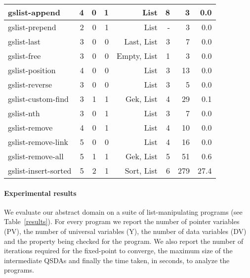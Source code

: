 \documentclass{llncs}
\begin{document}
\begin{table*}[thb]
{\begin{tabular}{|l| r | r | r | r|| r | r |r||}
{\sc gslist-append} & 4 & 0 & 1 & {\sc List} & 8 & 3 & 0.0 \\ \hline
{\sc gslist-prepend} & 2 & 0 & 1 & {\sc List} & - & 3 & 0.0  \\ \hline
{\sc gslist-last} & 3 & 0 & 0 & {\sc Last, List} & 3 & 7 & 0.0 \\ \hline
{\sc gslist-free} & 3 & 0 & 0 & {\sc Empty, List} & 1 & 3 & 0.0 \\ \hline
{\sc gslist-position} &4 & 0 & 0 & {\sc List} & 3 & 13 &  0.0 \\ \hline
{\sc gslist-reverse} & 3 & 0 & 0 & {\sc List} & 3 & 5 & 0.0 \\ \hline
{\sc gslist-custom-find} &3 & 1 & 1 & {\sc Gek, List}  & 4 & 29 & 0.1 \\ \hline
{\sc gslist-nth} & 3 & 0 & 1 & {\sc List} & 3 & 7 & 0.0 \\ \hline
{\sc gslist-remove} & 4 & 0 & 1 & {\sc List} & 4 & 10 & 0.0 \\ \hline
{\sc gslist-remove-link} & 5 & 0 & 0 & {\sc List} & 4 & 16 & 0.0 \\ \hline
{\sc gslist-remove-all} & 5 & 1 & 1 & {\sc Gek, List} & 5 & 51 & 0.6 \\ \hline
{\sc gslist-insert-sorted} & 5 & 2 & 1 & {\sc Sort, List} & 6 & 279 & 27.4 \\ \hline

	\end{tabular}
}
	\caption{\small Experimental results. Property checked --- {\sc List}: the return pointer points to a list; {\sc Init}: the list is properly initialized with some key; {\sc Max}: returned value is the maximum of all data values in the list; {\sc Gek}: the list (or some parts of the list) have data values greater than or equal to a key $k$; {\sc Sort}: the list is sorted; {\sc Last}: returned pointer is the last element of the list; {\sc Empty}: the returned list is empty.}
	\label{results}
\end{table*}



\paragraph{\bf Experimental results} We evaluate our abstract domain on a suite of list-manipulating programs (see Table~\ref{results}). For every program we report the number of pointer variables (PV), the number of universal variables (Y), the number of data variables (DV) and the property being checked for the program. We also report the number of iterations required for the fixed-point to converge, the maximum size of the intermediate QSDAs and finally the time taken, in seconds, to analyze the programs.
\end{document}
